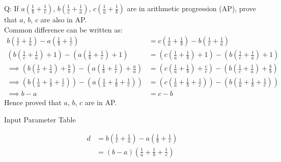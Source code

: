 \documentclass[journal,12pt,onecolumn]{IEEEtran}
\theoremstyle{remark}
\begin{document}
\let\vec\mathbf







\bigskip


Q: If $a\left(\frac{1}{b} + \frac{1}{c}\right)$, $b\left(\frac{1}{c} + \frac{1}{a}\right)$, $c\left(\frac{1}{a} + \frac{1}{b}\right)$ are in arithmetic progression (AP), prove that $a$, $b$, $c$ are also in AP. \\


\solution
Common difference can be written as: 
\begin{align}
b\left(\frac{1}{c} + \frac{1}{a}\right) - a\left(\frac{1}{b} + \frac{1}{c}\right) &= c\left(\frac{1}{a} + \frac{1}{b}\right) - b\left(\frac{1}{c} + \frac{1}{a}\right) \nonumber \\
(b\left(\frac{1}{c} + \frac{1}{a}\right)+1) - (a\left(\frac{1}{b} + \frac{1}{c}\right)+1) &= (c\left(\frac{1}{a} + \frac{1}{b}\right)+1) - (b\left(\frac{1}{c} + \frac{1}{a}\right)+1) \nonumber \\ \implies
(b\left(\frac{1}{c} + \frac{1}{a}\right) + \frac{b}{b}) - (a\left(\frac{1}{b} + \frac{1}{c}\right) + \frac{a}{a}) &= (c\left(\frac{1}{a} + \frac{1}{b}\right) + \frac{c}{c}) - (b\left(\frac{1}{c} + \frac{1}{a}\right) + \frac{b}{b}) \nonumber \\ \implies
(b\left(\frac{1}{a} + \frac{1}{b} + \frac{1}{c}\right)) - (a\left(\frac{1}{a} + \frac{1}{b} + \frac{1}{c}\right)) &= (c\left(\frac{1}{a} + \frac{1}{b} + \frac{1}{c}\right)) - (b\left(\frac{1}{a} + \frac{1}{b} + \frac{1}{c}\right)) \nonumber \\ \implies
b - a &= c - b \nonumber 
\end{align}
Hence proved that $a$, $b$, $c$ are in AP. \\

\begin{table}[!h]

\caption{Input Parameter Table}
\label{tab:11.9.5.16.tab1}
\end{table}

\begin{align}
d &=  b\left(\frac{1}{c} + \frac{1}{a}\right) - a\left(\frac{1}{b} + \frac{1}{c}\right) \\
&= (b - a)(\frac{1}{a} + \frac{1}{b} + \frac{1}{c})
\end{align}
\end{document}
